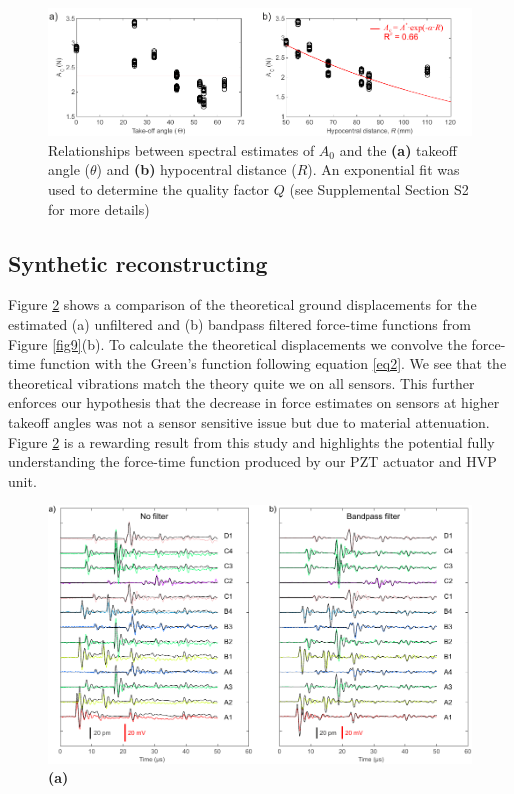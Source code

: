 \documentclass[preprint,3p, 11pt,authoryear]{elsarticle}
\begin{document}
\begin{figure}[ht]
     	\centering
\includegraphics[scale= 1]{FIG9a.pdf} 
\caption{Relationships between spectral estimates of $A_{0}$ and the \textbf{(a)} takeoff angle ($\theta$) and \textbf{(b)} hypocentral distance ($R$). An exponential fit was used to determine the quality factor $Q$ (see Supplemental Section S2 for more details)  }
	\label{fig9a} 
\end{figure}
\subsection{Synthetic reconstructing}
Figure \ref{fig10} shows a comparison of the theoretical ground displacements for the estimated (a) unfiltered and (b) bandpass filtered force-time functions from Figure \ref{fig9}(b).  To calculate the theoretical displacements we convolve the force-time function with the Green's function following equation \eqref{eq2}. We see that the theoretical vibrations match the theory quite we on all sensors. This further enforces our hypothesis that the decrease in force estimates on sensors at higher takeoff angles was not a sensor sensitive issue but due to material attenuation. Figure \ref{fig10} is a rewarding result from this study and highlights the potential fully understanding the force-time function produced by our PZT actuator and HVP unit.  

\begin{figure}[ht]
     	\centering
\includegraphics[scale= 1]{FIG10.pdf} 
\caption{\textbf{(a)}  }
	\label{fig10} 
\end{figure}
\end{document}
